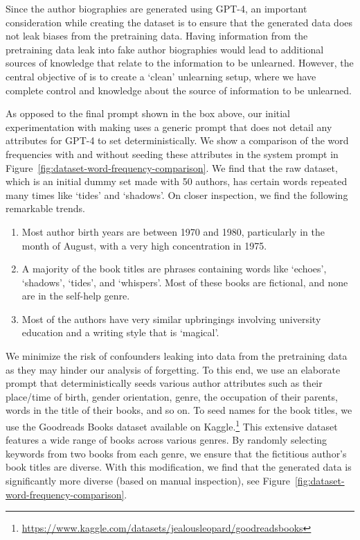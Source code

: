 Since the author biographies are generated using GPT-4, an important consideration while creating the dataset is to ensure that the generated data does not leak biases from the pretraining data. 
Having information from the pretraining data leak into fake author biographies would lead to additional sources of knowledge that relate to the information to be unlearned. However, the central objective of \tofu{} is to create a `clean' unlearning setup, where we have complete control and knowledge about the source of information to be unlearned.

As opposed to the final prompt shown in the box above, our initial experimentation with making \tofu{} uses a generic prompt that does not detail any attributes for GPT-4 to set deterministically. 
We show a comparison of the word frequencies with and without seeding these attributes in the system prompt in Figure~\ref{fig:dataset-word-frequency-comparison}. 
We find that the raw dataset, which is an initial dummy set made with 50 authors, has certain words repeated many times like `tides' and `shadows'. 
On closer inspection, we find the following remarkable trends. 
\begin{enumerate}
    \item Most author birth years are between 1970 and 1980, particularly in the month of August, with a very high concentration in 1975.
    \item A majority of the book titles are phrases containing words like `echoes', `shadows', `tides', and `whispers'. Most of these books are fictional, and none are in the self-help genre.
    \item Most of the authors have very similar upbringings involving university education and a writing style that is `magical'.
\end{enumerate}


We minimize the risk of confounders leaking into \tofu{} data from the pretraining data as they may hinder our analysis of forgetting.
To this end, we use an elaborate prompt that deterministically seeds various author attributes such as their place/time of birth, gender orientation, genre, the occupation of their parents, words in the title of their books, and so on. 
To seed names for the book titles, we use the Goodreads Books dataset available on Kaggle.\footnote{\url{https://www.kaggle.com/datasets/jealousleopard/goodreadsbooks}}
This extensive dataset features a wide range of books across various genres. 
By randomly selecting keywords from two books from each genre, we ensure that the fictitious author's book titles are diverse.
With this modification, we find that the generated data is significantly more diverse (based on manual inspection), see Figure~\ref{fig:dataset-word-frequency-comparison}.


